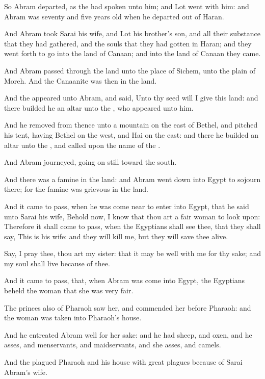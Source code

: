 \verse So Abram departed, as the \LORD had spoken unto him; and Lot went
with him: and Abram was seventy and five years old when he departed
out of Haran.

\verse And Abram took Sarai his wife, and Lot his brother's son, and all
their substance that they had gathered, and the souls that they had
gotten in Haran; and they went forth to go into the land of Canaan;
and into the land of Canaan they came.

\verse And Abram passed through the land unto the place of Sichem, unto
the plain of Moreh. And the Canaanite was then in the land.

\verse And the \LORD appeared unto Abram, and said, Unto thy seed will I
give this land: and there builded he an altar unto the \LORD, who
appeared unto him.

\verse And he removed from thence unto a mountain on the east of Bethel,
and pitched his tent, having Bethel on the west, and Hai on the east:
and there he builded an altar unto the \LORD, and called upon the name
of the \LORD.

\verse And Abram journeyed, going on still toward the south.

\verse And there was a famine in the land: and Abram went down into
Egypt to sojourn there; for the famine was grievous in the land.

\verse And it came to pass, when he was come near to enter into Egypt,
that he said unto Sarai his wife, Behold now, I know that thou art a
fair woman to look upon: \verse Therefore it shall come to pass, when
the Egyptians shall see thee, that they shall say, This is his wife:
and they will kill me, but they will save thee alive.

\verse Say, I pray thee, thou art my sister: that it may be well with
me for thy sake; and my soul shall live because of thee.

\verse And it came to pass, that, when Abram was come into Egypt, the
Egyptians beheld the woman that she was very fair.

\verse The princes also of Pharaoh saw her, and commended her before
Pharaoh: and the woman was taken into Pharaoh's house.

\verse And he entreated Abram well for her sake: and he had sheep, and
oxen, and he asses, and menservants, and maidservants, and she asses,
and camels.

\verse And the \LORD plagued Pharaoh and his house with great plagues
because of Sarai Abram's wife.

